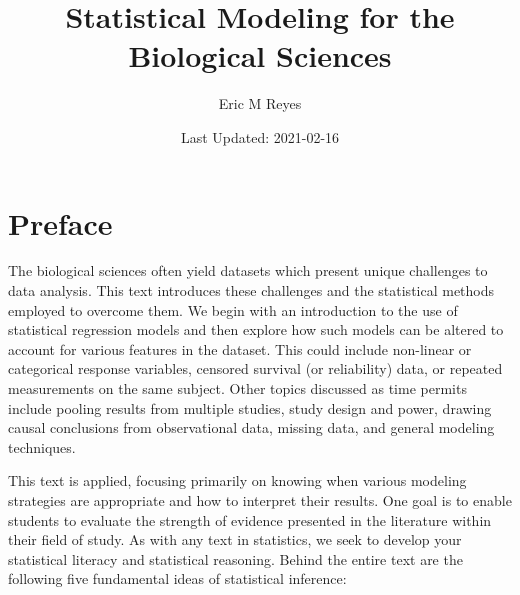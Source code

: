\documentclass[
]{book}
\title{Statistical Modeling for the Biological Sciences}
\author{Eric M Reyes}
\date{Last Updated: 2021-02-16}
\theoremstyle{plain}
\theoremstyle{mydefn}
\theoremstyle{myexmpl}
\theoremstyle{remark}
\begin{document}
\maketitle

{
\setcounter{tocdepth}{1}
\tableofcontents
}
\newcommand{\norm}[1]{\lVert#1\rVert}
\newcommand{\abs}[1]{\lvert#1\rvert}
\newcommand{\iid}{\stackrel{\text{IID}}{\sim}}
\newcommand{\ind}{\stackrel{\text{Ind}}{\sim}}

\newcommand{\bm}[1]{\mathbf{#1}}
\newcommand{\bs}[1]{\boldsymbol{#1}}
\newcommand{\bbeta}{\bs{\beta}}

\newcommand{\Ell}{\mathcal{L}}

\hypertarget{preface}{%
\chapter*{Preface}\label{preface}}

The biological sciences often yield datasets which present unique challenges to data analysis. This text introduces these challenges and the statistical methods employed to overcome them. We begin with an introduction to the use of statistical regression models and then explore how such models can be altered to account for various features in the dataset. This could include non-linear or categorical response variables, censored survival (or reliability) data, or repeated measurements on the same subject. Other topics discussed as time permits include pooling results from multiple studies, study design and power, drawing causal conclusions from observational data, missing data, and general modeling techniques.

This text is applied, focusing primarily on knowing when various modeling strategies are appropriate and how to interpret their results. One goal is to enable students to evaluate the strength of evidence presented in the literature within their field of study. As with any text in statistics, we seek to develop your statistical literacy and statistical reasoning. Behind the entire text are the following five fundamental ideas of statistical inference:
\end{document}
